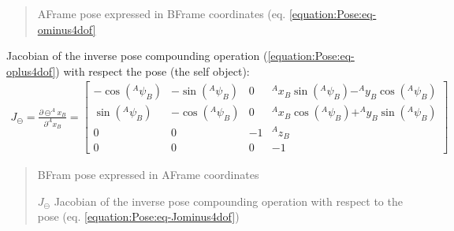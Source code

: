 \documentclass[letterpaper,10pt,english]{sphinxmanual}
\begin{document}
\begin{fulllineitems}
\begin{fulllineitems}
\begin{quote}
\begin{description}
\sphinxAtStartPar
A\sphinxhyphen{}Frame pose expressed in B\sphinxhyphen{}Frame coordinates (eq. \eqref{equation:Pose:eq-ominus4dof}

\end{description}\end{quote}

\end{fulllineitems}


\begin{fulllineitems}
\label{\detokenize{Pose:Pose.Pose4D.J_ominus}}
\pysigstartsignatures
{}
\pysigstopsignatures
\sphinxAtStartPar
Jacobian of the inverse pose compounding operation (\eqref{equation:Pose:eq-oplus4dof}) with respect the pose  (the self object):
\begin{equation}\label{equation:Pose:eq-Jominus4dof}
\begin{split}J_{\ominus}=\frac{\partial  \ominus ^Ax_B}{\partial ^Ax_B} =
\begin{bmatrix}
    -\cos(^A\psi_B) & -\sin(^A\psi_B) & 0 & ^Ax_B \sin(^A\psi_B) - ^Ay_B \cos(^A\psi_B) \\
    \sin(^A\psi_B) & -\cos(^A\psi_B) & 0 & ^Ax_B \cos(^A\psi_B) + ^Ay_B \sin(^A\psi_B) \\
    0 & 0 & -1 & ^Az_B \\
    0 & 0 & 0 & -1
\end{bmatrix}\end{split}
\end{equation}\begin{quote}\begin{description}
\sphinxAtStartPar
{} \textendash{} B\sphinxhyphen{}Fram pose expressed in A\sphinxhyphen{}Frame coordinates

\sphinxAtStartPar
\(J_{\ominus}\) Jacobian of the inverse pose compounding operation with respect to the pose (eq. \eqref{equation:Pose:eq-Jominus4dof})

\end{description}\end{quote}

\end{fulllineitems}


\end{fulllineitems}
\end{document}
